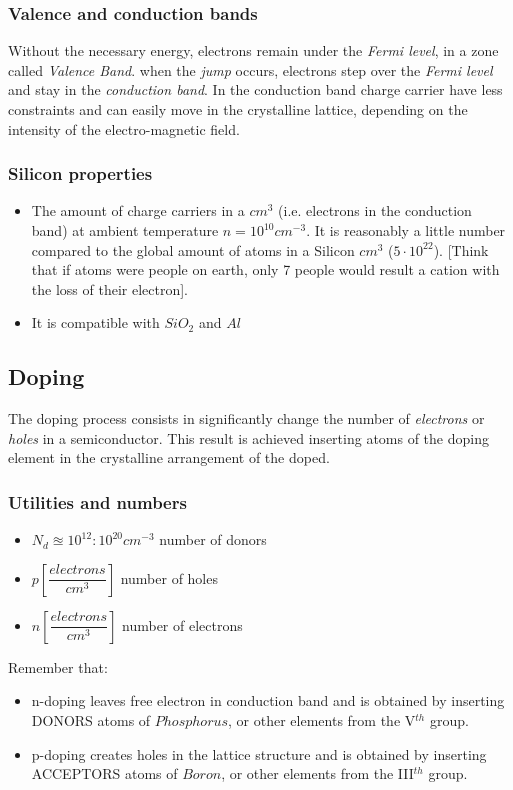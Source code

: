 \documentclass[12pt]{article}
\newcommand{\I}{\textit}
\newcommand{\bite}{\begin{itemize}} %
\newcommand{\fite}{\end{itemize}}   %
\begin{document}
\subsubsection{Valence and conduction bands}
Without the necessary energy, electrons remain under the \I{Fermi level}, in a zone called \I{Valence Band}. when the \I{jump} occurs, electrons step over the \I{Fermi level} and stay in the \I{conduction band}. In the conduction band charge carrier have less constraints and can easily move in the crystalline lattice, depending on the intensity of the electro-magnetic field.
\subsubsection{Silicon properties}
\bite
	\item The amount of charge carriers in a $cm^3$ (i.e. electrons in the conduction band) at ambient temperature $n = 10^{10} cm^{-3}$. It is reasonably a little number compared to the global amount of atoms in a Silicon $cm^3$ ($5 \cdot 10^{22}$). [Think that if atoms were people on earth, only 7 people would result a cation with the loss of their electron]. 
	\item It is compatible with $SiO_2$ and $Al$
\fite

\subsection{Doping}
The doping process consists in significantly change the number of \textit{electrons }or \textit{holes} in a semiconductor.
This result is achieved inserting atoms of the doping element in the crystalline arrangement of the doped.
\subsubsection{Utilities and numbers}
\begin{itemize}
	\item $N_{d} \approxeq 10^{12} : 10^{20} cm^{-3}$ number of donors
	\item $p 	[\dfrac{electrons}{cm^3}]$ number of holes 
	\item $n 	[\dfrac{electrons}{cm^3}]$ number of electrons 
\end{itemize}
Remember that:
\begin{itemize}
	\item n-doping leaves free electron in conduction band and is obtained by inserting DONORS atoms of $Phosphorus$, or other elements from the V$^{th}$ group.
	\item p-doping creates holes in the lattice structure and is obtained by inserting ACCEPTORS atoms of $Boron$, or other elements from the III$^{th}$ group. 
\end{itemize}
\end{document}
